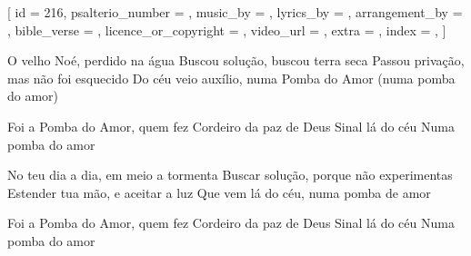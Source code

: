[
    id                     = {216},
    psalterio_number       = {},
    music_by               = {},
    lyrics_by              = {},
    arrangement_by         = {},
    bible_verse            = {},
    licence_or_copyright   = {},
    video_url              = {},
    extra                  = {},
    index                  = {},
]


\beginverse

O velho Noé, perdido na água
Buscou solução, buscou terra seca
Passou privação, mas não foi esquecido
Do céu veio auxílio, numa Pomba do Amor (numa pomba do amor)

\endverse


\beginchorus

Foi a Pomba do Amor, quem fez
Cordeiro da paz de Deus
Sinal lá do céu
Numa pomba do amor

\endchorus


\beginverse

No teu dia a dia, em meio a tormenta
Buscar solução, porque não experimentas
Estender tua mão, e aceitar a luz
Que vem lá do céu, numa pomba de amor

\endverse


\beginchorus

Foi a Pomba do Amor, quem fez
Cordeiro da paz de Deus
Sinal lá do céu
Numa pomba do amor

\endchorus

\endsong
